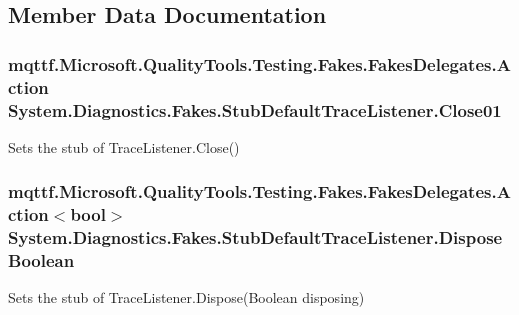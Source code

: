 \subsection{Member Data Documentation}
\hypertarget{class_system_1_1_diagnostics_1_1_fakes_1_1_stub_default_trace_listener_a8eef0b8f151da2c018f48c2c600953d5}{
\subsubsection[{Close01}]{\setlength{\rightskip}{0pt plus 5cm}mqttf.\-Microsoft.\-Quality\-Tools.\-Testing.\-Fakes.\-Fakes\-Delegates.\-Action System.\-Diagnostics.\-Fakes.\-Stub\-Default\-Trace\-Listener.\-Close01}}\label{class_system_1_1_diagnostics_1_1_fakes_1_1_stub_default_trace_listener_a8eef0b8f151da2c018f48c2c600953d5}


Sets the stub of Trace\-Listener.\-Close()

\hypertarget{class_system_1_1_diagnostics_1_1_fakes_1_1_stub_default_trace_listener_a1b780dd59bddb56ae6e2808b9412dcd4}{
\subsubsection[{Dispose\-Boolean}]{\setlength{\rightskip}{0pt plus 5cm}mqttf.\-Microsoft.\-Quality\-Tools.\-Testing.\-Fakes.\-Fakes\-Delegates.\-Action$<$bool$>$ System.\-Diagnostics.\-Fakes.\-Stub\-Default\-Trace\-Listener.\-Dispose\-Boolean}}\label{class_system_1_1_diagnostics_1_1_fakes_1_1_stub_default_trace_listener_a1b780dd59bddb56ae6e2808b9412dcd4}


Sets the stub of Trace\-Listener.\-Dispose(\-Boolean disposing)

